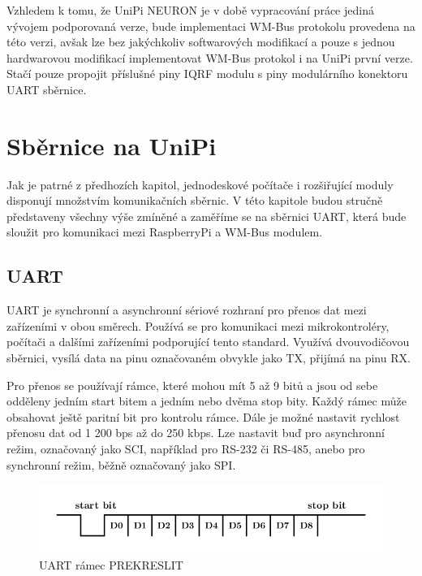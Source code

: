 Vzhledem k tomu, že UniPi NEURON je v době vypracování práce jediná vývojem podporovaná verze, bude implementaci WM-Bus protokolu provedena na této verzi, avšak lze bez jakýchkoliv softwarových modifikací a pouze s jednou hardwarovou modifikací implementovat WM-Bus protokol i na UniPi první verze. Stačí pouze propojit příslušné piny IQRF modulu s piny modulárního konektoru UART sběrnice.



\section{Sběrnice na UniPi}
Jak je patrné z předhozích kapitol, jednodeskové počítače i rozšiřující moduly disponují množstvím komunikačních sběrnic. V této kapitole budou stručně představeny všechny výše zmíněné a zaměříme se na sběrnici UART, která bude sloužit pro komunikaci mezi RaspberryPi a WM-Bus modulem.

\subsection{UART}
UART je synchronní a asynchronní sériové rozhraní pro přenos dat mezi zařízeními v obou směrech. Používá se pro komunikaci mezi mikrokontroléry, počítači a dalšími zařízeními podporující tento standard. Využívá dvouvodičovou sběrnici, vysílá data na pinu označovaném obvykle jako TX, přijímá na pinu RX.

Pro přenos se používají rámce, které mohou mít 5 až 9 bitů a jsou od sebe odděleny jedním start bitem a jedním nebo dvěma stop bity. Každý rámec může obsahovat ještě paritní bit pro kontrolu rámce. Dále je možné nastavit rychlost přenosu dat od 1 200 bps až do 250 kbps. Lze nastavit buď pro asynchronní režim, označovaný jako SCI, například pro RS-232 či RS-485, anebo pro synchronní režim, běžně označovaný jako SPI.

 \begin{figure}[!h]
  \begin{center}
    \includegraphics[scale=1.0]{obrazky/sbernice_uart}
  \end{center}
  \caption{UART rámec \cite{SberniceUART} \colorbox[rgb]{1,0,0}{PREKRESLIT}}
\end{figure}

